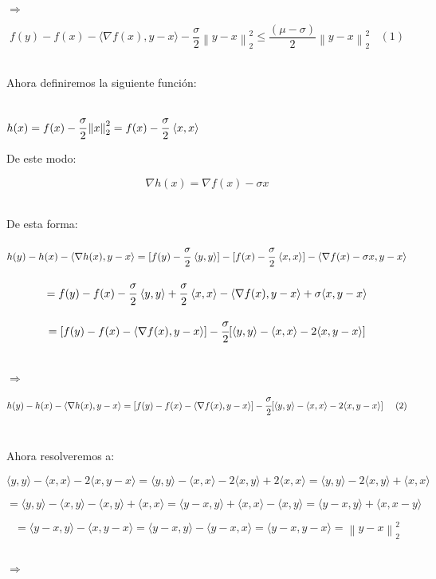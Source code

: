 \documentclass[11pt]{article}
\begin{document}
$ \Rightarrow $ 

\[ f(y) - f(x) - \langle \nabla f(x), y-x \rangle - \frac{\sigma}{2} \left\| y-x \right\|_2^2 \leq \frac{(\mu - \sigma)}{2} \left\| y-x \right\|_2^2 \ \ \ \ (1)  \] \

Ahora definiremos la siguiente función: \

$ \ $ 

$ h(x) = f(x) - \cfrac{\sigma}{2} \left\| x \right\|_2^2 = f(x) - \cfrac{\sigma}{2} \ \langle x,x \rangle   $ \\

$ \ $ 

De este modo:

\[ \nabla h(x) = \nabla f(x)- \sigma x \] \

De esta forma: \ \

\[ h(y) - h(x) - \langle \nabla h(x),y-x \rangle = [f(y) - \cfrac{\sigma}{2} \ \langle y,y \rangle] - [f(x) - \cfrac{\sigma}{2} \ \langle x,x \rangle] - \langle \nabla f(x)- \sigma x ,y-x \rangle  \]

\[ = f(y) - f(x) - \cfrac{\sigma}{2} \ \langle y,y \rangle + \cfrac{\sigma}{2} \ \langle x,x \rangle - \langle \nabla f(x),y-x \rangle + \sigma \langle x ,y-x \rangle \]

\[ = [f(y) - f(x) - \langle \nabla f(x),y-x \rangle] - \cfrac{\sigma}{2} [\langle y,y \rangle - \langle x,x \rangle - 2 \langle x,y-x \rangle]  \] \

$ \Rightarrow $ 

\[ h(y) - h(x) - \langle \nabla h(x),y-x \rangle = [f(y) - f(x) - \langle \nabla f(x),y-x \rangle] - \cfrac{\sigma}{2} [\langle y,y \rangle - \langle x,x \rangle - 2 \langle x,y-x \rangle] \ \ \ \ (2) \] \

Ahora resolveremos a:

\[ \langle y,y \rangle - \langle x,x \rangle - 2 \langle x,y-x \rangle = \langle y,y \rangle - \langle x,x \rangle - 2 \langle x,y \rangle + 2 \langle x,x \rangle = \langle y,y \rangle - 2 \langle x,y \rangle +  \langle x,x \rangle \]

\[ = \langle y,y \rangle - \langle x,y \rangle - \langle x,y \rangle +  \langle x,x \rangle = \langle y-x,y \rangle +  \langle x,x \rangle - \langle x,y \rangle = \langle y-x,y \rangle +  \langle x,x-y \rangle  \]

\[ = \langle y-x,y \rangle -  \langle x,y-x \rangle = \langle y-x,y \rangle -  \langle y-x,x \rangle = \langle y-x,y-x \rangle = \left\| y-x \right\|_2^2 \] \

$ \Rightarrow $ 
\end{document}
